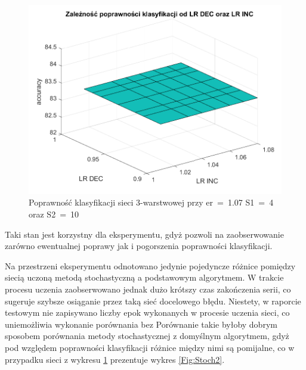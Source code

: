 \documentclass[12pt,twoside]{article}
\begin{document}
\begin{figure}[ht]
	\centering
	\includegraphics[width=16cm]{figures/Stoch_1.png}
	\caption{Poprawność klasyfikacji sieci 3-warstwowej przy er~=~1.07 S1~=~4 oraz S2~=~10}
	\label{Fig:Stoch1}
\end{figure}
Taki stan jest korzystny dla eksperymentu, gdyż pozwoli na zaobserwowanie zarówno ewentualnej poprawy jak i pogorszenia poprawności klasyfikacji.


Na przestrzeni eksperymentu odnotowano jedynie pojedyncze różnice pomiędzy siecią uczoną metodą stochastyczną a podstawowym algorytmem.
W trakcie procesu uczenia zaobserwowano jednak dużo krótszy czas zakończenia serii, co sugeruje szybsze osiąganie przez taką sieć docelowego błędu.
Niestety, w raporcie testowym nie zapisywano liczby epok wykonanych w procesie uczenia sieci, co uniemożliwia wykonanie porównania bez
Porównanie takie byłoby dobrym sposobem porównania metody stochastycznej z domyślnym algorytmem, gdyż pod względem poprawności klasyfikacji różnice między nimi są pomijalne, co w przypadku sieci z wykresu \ref{Fig:Stoch1} prezentuje wykres \ref{Fig:Stoch2}.
\end{document}
